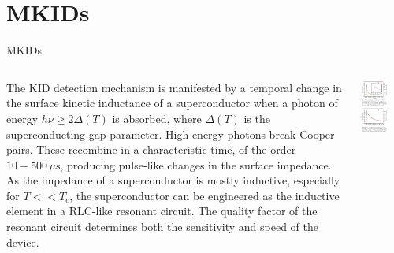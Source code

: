 \documentclass[ignorenonframetext,12pt]{beamer}
\begin{document}
\section{MKIDs}
\begin{frame}{MKIDs}
				\begin{columns}
								\begin{column}{0.49\textwidth}
												\footnotesize{The KID detection mechanism is manifested
												by a temporal change in the surface kinetic inductance
												of a superconductor when a photon of energy $h\nu \geq
												2 \Delta(T)$ is absorbed, where $\Delta(T)$ is the
												superconducting gap parameter. High energy photons break
												Cooper pairs. These recombine in a characteristic time,
												of the order $10-500\,\mu\text{s}$,
												{\color{red}producing pulse-like changes in the surface
												impedance}. As the impedance of a superconductor is
												mostly inductive, especially for $T << T_c$, the
												superconductor can be engineered as the inductive
												element in a RLC-like resonant circuit. {\color{blue}The
												quality factor of the resonant circuit determines both the
												sensitivity and speed of the device}.}

								\end{column}
								\begin{column}{0.49\textwidth}
								\includegraphics[width=0.62\textwidth]{pulso_respuesta_mkid}
								\end{column}
				\end{columns}
\end{frame}
\end{document}
